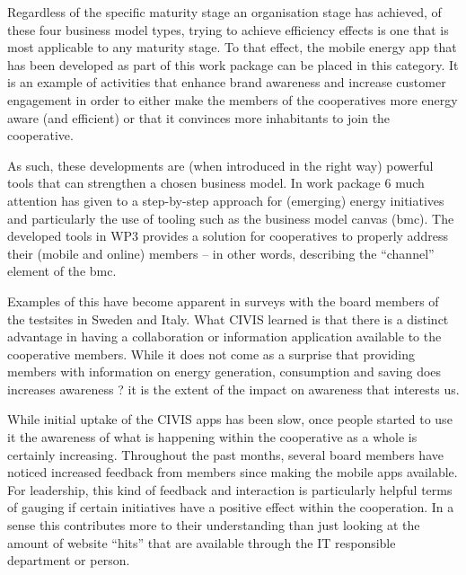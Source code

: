 Regardless of the specific maturity stage an organisation stage has achieved, of these four business model types, trying to achieve efficiency effects is one that is most applicable to any maturity stage. 
% 
To that effect, the mobile energy app that has been developed as part of this work package can be placed in this category. It is an example of activities that enhance brand awareness and increase customer engagement in order to either make the members of the cooperatives more energy aware (and efficient) or that it convinces more inhabitants to join the cooperative.

As such, these developments are (when introduced in the right way) powerful tools that can strengthen a chosen business model. In work package 6 much attention has given to a step-by-step approach for (emerging) energy initiatives and particularly the use of tooling such as the business model canvas (bmc). The developed tools in WP3 provides a solution for cooperatives to properly address their (mobile and online) members -- in other words, describing the ``channel'' element of the bmc.

Examples of this have become apparent in surveys with the board members of the testsites
in Sweden and Italy. What CIVIS learned is that there is a distinct advantage in having
a collaboration or information application available to the cooperative members.
While it does not come as a surprise that providing members with information on energy
generation, consumption and saving does increases awareness ? it is the extent of the impact
on awareness that interests us.

While initial uptake of the CIVIS apps has been slow, once people started to use it the
awareness of what is happening within the cooperative as a whole is certainly increasing.
Throughout the past months, several board members have noticed increased feedback from members since making the mobile apps available. For leadership, this kind of feedback
and interaction is particularly helpful terms of gauging if certain initiatives have a positive
effect within the cooperation. In a sense this contributes more to their understanding than
just looking at the amount of website ``hits'' that are available through the IT responsible
department or person. 

